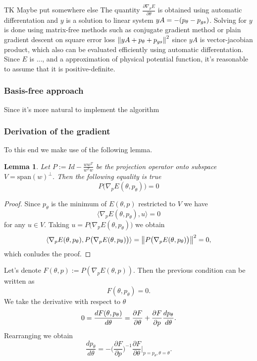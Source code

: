 \documentclass[a4paper,10pt]{report}
\newtheorem{lemma}{Lemma}
\begin{document}
TK Maybe put somewhere else
The quantity $\frac{\partial \nabla_p E}{\partial \theta}$ is obtained using automatic differentation and $y$ is a solution to linear system $yA = -(p_\theta-p_{gs})$. Solving for $y$ is done using matrix-free methods such as conjugate gradient method or plain gradient descent on square error loss $\left\|yA + p_\theta+p_{gs}\right\|^2$ since $yA$ is vector-jacobian product, which also can be evaluated efficiently using automatic differentation. Since $E$ is ..., and a approximation of physical potential function, it's reasonable to assume that it is positive-definite.

\subsubsection{Basis-free approach}

Since it's more natural to implement the algorithm


\subsubsection{Derivation of the gradient}
 To this end we make use of the following lemma.

\begin{lemma}
 Let $P := Id -\frac{ww^T}{w^Tw} $ be the projection operator onto subspace $V = \text{span}(w)^{\perp}$. Then the following equality is true
 \begin{equation}
  P\big(\nabla_p E(\theta, p_\theta)\big) = 0
 \end{equation}

\end{lemma}

\begin{proof}
  Since $p_\theta$ is the minimum of $E(\theta,p)$ restricted to $V$ we have \[\langle \nabla_p E(\theta,p_{\theta}), u \rangle = 0\] for any $u\in V$. Taking $u = P\big( \nabla_p E(\theta,p_\theta)\big)$ we obtain
  \[\langle \nabla_p E(\theta,p_{\theta}), P\big( \nabla_p E(\theta,p_\theta)\big) \rangle = \left\|P\big( \nabla_p E(\theta,p_\theta)\big)\right\|^2=0,\]
  which conludes the proof.
\end{proof}

Let's denote $F(\theta,p) :=P (\nabla_p E(\theta,p)).$ Then the previous condition can be written as
\begin{equation}
 F(\theta,p_\theta) = 0.
\end{equation}
We take the derivative with respect to $\theta$
\begin{equation}
0=\frac{dF(\theta, p_\theta)}{d \theta} = \frac{\partial F}{\partial \theta} + \frac{\partial F}{\partial p} \frac{dp_\theta}{d \theta}.
\end{equation}
Rearranging we obtain
\begin{equation}
 \frac{d p_\theta}{d\theta} = - \bigg(\frac{\partial F}{\partial p}\bigg)^{-1}  \frac{\partial F}{\partial \theta}\bigg|_{p=p_\theta, \theta=\theta}.
\end{equation}
\end{document}
